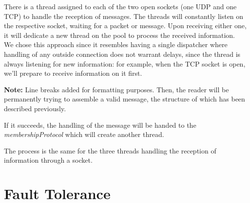 \documentclass{article}
\begin{document}
\begin{multicols}{2}
    There is a thread assigned to each of the two open sockets (one UDP and one TCP) to handle the reception of messages. The threads will constantly listen on the respective socket, waiting for a packet or message. Upon receiving either one, it will dedicate a new thread on the pool to process the received information.\\
    
    We chose this approach since it resembles having a single dispatcher where handling of any outside connection does not warrant delays, since the thread is always listening for new information: for example, when the TCP socket is open, we'll prepare to receive information on it first.

    
    \textbf{Note:}{ Line breaks added for formatting purposes.}
    \break
    Then, the reader will be permanently trying to assemble a valid message, the structure of which has been described previously. 
    
    If it succeeds, the handling of the message will be handed to the \textit{membershipProtocol} which will create another thread. 
    
    The process is the same for the three threads handling the reception of information through a socket.
    
    \section{Fault Tolerance}

\end{multicols}
\end{document}
